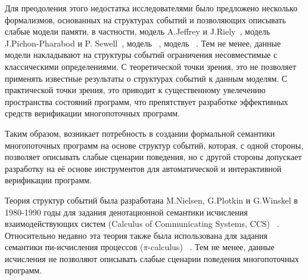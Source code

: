 Для преодоления этого недостатка исследователями было
предложено несколько формализмов, основанных на структурах событий
и позволяющих описывать слабые модели памяти,
в частности, модель A.Jeffrey и J.Riely~\autocite{Jeffrey-Riely:LICS16},
модель J.Pichon-Pharabod и P. Sewell~\autocite{PichonPharabod-Sewell:POPL16},
модель \Wkm~\autocite{Chakraborty-Vafeiadis:POPL19},
модель \MRD~\autocite{Paviotti-al:ESOP20}. 
Тем не менее, данные модели накладывают на структуры событий
ограничения несовместимые с классическими определениями. 
С теоретической точки зрения, это не позволяет 
применять известные результаты о структурах событий к данным моделям. 
С практической точки зрения, это приводит к существенному увелечению 
пространства состояний программ, что препятствует разработке эффективных 
средств верификации многопоточных программ.

Таким образом, возникает потребность в создании формальной семантики 
многопоточных программ на основе структур событий, 
которая, с одной стороны, позволяет описывать слабые сценарии поведения, 
но с другой стороны допускает разработку на её основе 
инструментов для автоматической и интерактивной верификации программ. 

{\progress}

Теория структур событий была разработана M.Nielsen, G.Plotkin и G.Winskel
в 1980-1990 годы для задания денотационной семантики 
исчисления взаимодействующих систем (Calculus of Communicating Systems, CCS)%
~\autocite{Winskel:ICALP1982}.
Относительно недавно эта теория также была использована 
для задания семантики пи-исчисления процессов ($\pi$-calculus)%
~\autocite{Varacca-Nobuko:TCS10,Crafa-al:FSCCS12,Hildebrandt-al:LATA2017}.
Тем не менее, данные исчисления не позволяют описывать 
слабые сценарии поведения многопоточных программ.

